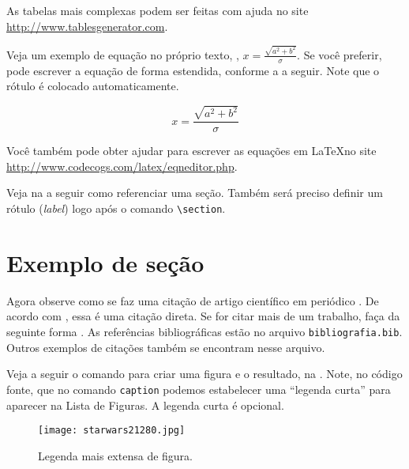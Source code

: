 As tabelas mais complexas podem ser feitas com ajuda no site \href{http://www.tablesgenerator.com}{http://www.tables\-ge\-ne\-ra\-tor.com}.

Veja um exemplo de equação no próprio texto, \eg, $x=\frac{\sqrt{a^{2}+b^{2}}}{\sigma}$.  Se você preferir, pode escrever a equação de forma estendida, conforme a  a seguir. Note que o rótulo é colocado automaticamente.

\begin{equation}
x=\frac{\sqrt{a^{2}+b^{2}}}{\sigma}
\label{eq:teste}
\end{equation}


Você também pode obter ajudar para escrever as equações em \LaTeX no site \url{http://www.codecogs.com/latex/eqneditor.php}.



Veja na  a seguir como referenciar uma seção. Também será preciso definir um rótulo (\textit{label}) logo após o comando \texttt{\textbackslash section}.

\section{Exemplo de seção}\label{sec:exemplo_secao} 
Agora observe como se faz uma citação de artigo científico em periódico \cite{Gradvohl2014c}. De acordo com \textcite{Gradvohl2016}, essa é uma citação direta. Se for citar mais de um trabalho, faça da seguinte forma \cite{Caldana2017,Gradvohl2015}. As referências bibliográficas estão no arquivo \texttt{bibliografia.bib}. Outros exemplos de citações também se encontram nesse arquivo.

Veja a seguir o comando para criar uma figura e o resultado, na . Note, no código fonte, que no comando \texttt{caption} podemos estabelecer uma \enquote{legenda curta} para aparecer na Lista de Figuras. A legenda curta é opcional.

\begin{figure}[!htb]
\centering
\texttt{[image: starwars21280.jpg]}
\caption[Legenda curta de figura]{Legenda mais extensa de figura.}
\label{fig:xwing}
\end{figure}

